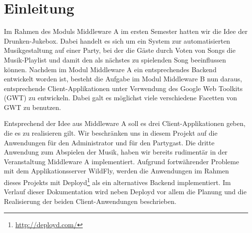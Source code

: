\section{Einleitung}
Im Rahmen des Moduls Middleware A im ersten Semester hatten wir die Idee der Drunken-Jukebox. Dabei handelt es sich um ein System zur automatisierten Musikgestaltung auf einer Party, bei der die Gäste durch Voten von Songs die Musik-Playlist und damit den als nächstes zu spielenden Song beeinflussen können. Nachdem im Modul Middleware A ein entsprechendes Backend entwickelt worden ist, besteht die Aufgabe im Modul Middleware B nun daraus, entsprechende Client-Applikationen unter Verwendung des Google Web Toolkits (GWT) zu entwickeln. Dabei galt es möglichst viele verschiedene Facetten von GWT zu benutzen.

Entsprechend der Idee aus Middleware A soll es drei Client-Applikationen geben, die es zu realisieren gilt. Wir beschränken uns in diesem Projekt auf die Anwendungen für den Administrator und für den Partygast. Die dritte Anwendung zum Abspielen der Musik, haben wir bereits rudimentär in der Veranstaltung Middleware A implementiert. Aufgrund fortwährender Probleme mit dem Applikationsserver WildFly, werden die Anwendungen im Rahmen dieses Projekts mit Deployd\footnote{\url{http://deployd.com/}} als ein alternatives Backend implementiert. Im Verlauf dieser Dokumentation wird neben Deployd vor allem die Planung und die Realisierung der beiden Client-Anwendungen beschrieben.